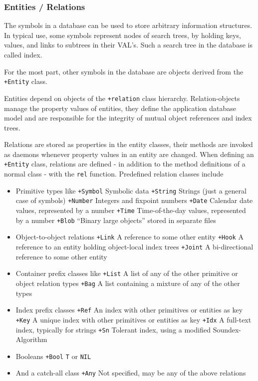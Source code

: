  
\subsubsection{Entities / Relations}
\label{sec:refm-entities-/-relations}%
The symbols in a database can be used to store arbitrary information
structures. In typical use, some symbols represent nodes of search
trees, by holding keys, values, and links to subtrees in their VAL's.
Such a search tree in the database is called index.

For the most part, other symbols in the database are objects derived
from the \texttt{+Entity} class.

Entities depend on objects of the \texttt{+relation} class hierarchy.
Relation-objects manage the property values of entities, they define the
application database model and are responsible for the integrity of
mutual object references and index trees.

Relations are stored as properties in the entity classes, their methods
are invoked as daemons whenever property values in an entity are
changed. When defining an \texttt{+Entity} class, relations are defined - in
addition to the method definitions of a normal class - with the \texttt{rel}
function. Predefined relation classes include

\begin{itemize}
\item Primitive types like
   \texttt{+Symbol}
   Symbolic data
   \texttt{+String}
   Strings (just a general case of symbols)
   \texttt{+Number}
   Integers and fixpoint numbers
   \texttt{+Date}
   Calendar date values, represented by a number
   \texttt{+Time}
   Time-of-the-day values, represented by a number
   \texttt{+Blob}
   ``Binary large objects'' stored in separate files
\item Object-to-object relations
   \texttt{+Link}
   A reference to some other entity
   \texttt{+Hook}
   A reference to an entity holding object-local index trees
   \texttt{+Joint}
   A bi-directional reference to some other entity
\item Container prefix classes like
   \texttt{+List}
   A list of any of the other primitive or object relation types
   \texttt{+Bag}
   A list containing a mixture of any of the other types
\item Index prefix classes
   \texttt{+Ref}
   An index with other primitives or entities as key
   \texttt{+Key}
   A unique index with other primitives or entities as key
   \texttt{+Idx}
   A full-text index, typically for strings
   \texttt{+Sn}
   Tolerant index, using a modified Soundex-Algorithm
\item Booleans
   \texttt{+Bool}
   \texttt{T} or \texttt{NIL}
\item And a catch-all class
   \texttt{+Any}
   Not specified, may be any of the above relations
\end{itemize}


